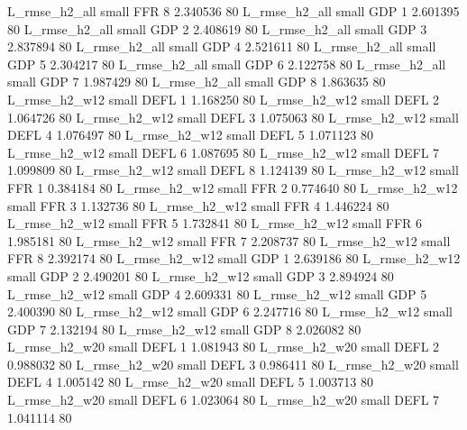  L_rmse_h2_all      small      FFR                 8 2.340536 80
 L_rmse_h2_all      small      GDP                 1 2.601395 80
 L_rmse_h2_all      small      GDP                 2 2.408619 80
 L_rmse_h2_all      small      GDP                 3 2.837894 80
 L_rmse_h2_all      small      GDP                 4 2.521611 80
 L_rmse_h2_all      small      GDP                 5 2.304217 80
 L_rmse_h2_all      small      GDP                 6 2.122758 80
 L_rmse_h2_all      small      GDP                 7 1.987429 80
 L_rmse_h2_all      small      GDP                 8 1.863635 80
 L_rmse_h2_w12      small     DEFL                 1 1.168250 80
 L_rmse_h2_w12      small     DEFL                 2 1.064726 80
 L_rmse_h2_w12      small     DEFL                 3 1.075063 80
 L_rmse_h2_w12      small     DEFL                 4 1.076497 80
 L_rmse_h2_w12      small     DEFL                 5 1.071123 80
 L_rmse_h2_w12      small     DEFL                 6 1.087695 80
 L_rmse_h2_w12      small     DEFL                 7 1.099809 80
 L_rmse_h2_w12      small     DEFL                 8 1.124139 80
 L_rmse_h2_w12      small      FFR                 1 0.384184 80
 L_rmse_h2_w12      small      FFR                 2 0.774640 80
 L_rmse_h2_w12      small      FFR                 3 1.132736 80
 L_rmse_h2_w12      small      FFR                 4 1.446224 80
 L_rmse_h2_w12      small      FFR                 5 1.732841 80
 L_rmse_h2_w12      small      FFR                 6 1.985181 80
 L_rmse_h2_w12      small      FFR                 7 2.208737 80
 L_rmse_h2_w12      small      FFR                 8 2.392174 80
 L_rmse_h2_w12      small      GDP                 1 2.639186 80
 L_rmse_h2_w12      small      GDP                 2 2.490201 80
 L_rmse_h2_w12      small      GDP                 3 2.894924 80
 L_rmse_h2_w12      small      GDP                 4 2.609331 80
 L_rmse_h2_w12      small      GDP                 5 2.400390 80
 L_rmse_h2_w12      small      GDP                 6 2.247716 80
 L_rmse_h2_w12      small      GDP                 7 2.132194 80
 L_rmse_h2_w12      small      GDP                 8 2.026082 80
 L_rmse_h2_w20      small     DEFL                 1 1.081943 80
 L_rmse_h2_w20      small     DEFL                 2 0.988032 80
 L_rmse_h2_w20      small     DEFL                 3 0.986411 80
 L_rmse_h2_w20      small     DEFL                 4 1.005142 80
 L_rmse_h2_w20      small     DEFL                 5 1.003713 80
 L_rmse_h2_w20      small     DEFL                 6 1.023064 80
 L_rmse_h2_w20      small     DEFL                 7 1.041114 80
